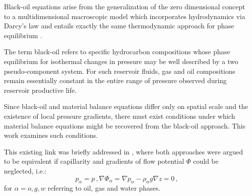 \documentclass[authoryear,preprint,review,12pt]{elsarticle}
\begin{document}
Black-oil equations arise from the generalization of the zero dimensional concept to a multidimensional macroscopic model which incorporates hydrodynamics via Darcy's law and entails exactly the same thermodynamic approach for phase equilibrium \citep{aziz1979petroleum}.


The term black-oil refers to specific hydrocarbon compositions whose phase equilibrium for isothermal changes in pressure may be well described by a two pseudo-component system. For such reservoir fluids, gas and oil compositions remain essentially constant in the entire range of pressure observed during reservoir productive life. 


Since black-oil and material balance equations differ only on spatial scale and the existence of local pressure gradients, there must exist conditions under which material balance equations might be recovered from the black-oil approach. This work examines such conditions. 

This existing link was briefly addressed in \cite{ertekin2001basic}, where both approaches were argued to be equivalent if capillarity and gradients of flow potential $\Phi$ could be neglected, i.e.:
\begin{subequations}
\begin{equation}
p_\alpha = p \, ,
\end{equation}
\begin{equation}
\nabla \Phi_\alpha = \nabla p_\alpha - \rho_\alpha g \nabla z = 0 \, ,
\end{equation}
\end{subequations}
for $\alpha=o,g,w$ referring to oil, gas and water phases.

\end{document}
